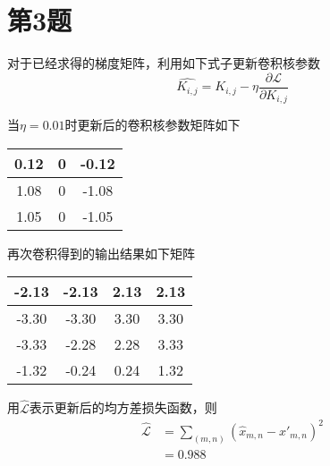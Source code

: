 \documentclass[12pt,AutoFakeBold]{article}
\begin{document}
    \section*{第3题}
    对于已经求得的梯度矩阵，利用如下式子更新卷积核参数
    \[\hat{K_{i,j}} = K_{i,j} - \eta\frac{\partial \mathcal{L}}{\partial K_{i,j}}\]

    当\(\eta = 0.01\)时更新后的卷积核参数矩阵如下
    \begin{center}
        \begin{tabular}{|c|c|c|}
            \hline
            0.12&0&-0.12\\
            \hline
            1.08&0&-1.08\\
            \hline
            1.05&0&-1.05\\
            \hline
        \end{tabular}
    \end{center}

    再次卷积得到的输出结果如下矩阵
    \begin{center}
        \begin{tabular}{|c|c|c|c|}
            \hline
            -2.13&-2.13&2.13&2.13\\
            \hline
            -3.30&-3.30&3.30&3.30\\
            \hline
            -3.33&-2.28&2.28&3.33\\
            \hline
            -1.32&-0.24&0.24&1.32\\
            \hline
        \end{tabular}
    \end{center}

    用\(\hat{\mathcal{L}}\)表示更新后的均方差损失函数，则
    \begin{equation}
        \begin{split}
            \hat{\mathcal{L}} &= \sum_{(m,n)} (\hat{x}_{m,n} - {x'}_{m,n})^2\\
            &= 0.988
        \end{split}
    \end{equation}
\end{document}
